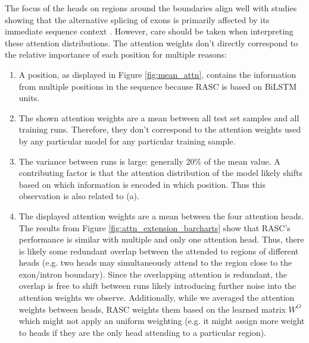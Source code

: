 The focus of the heads on regions around the boundaries align well with studies showing that the alternative splicing of exons is primarily affected by its immediate sequence context \cite{dsc} \cite{immediatesequencemostimportant} \cite{immediatesequencemostimportant2}. 
However, care should be taken when interpreting these attention distributions. The attention weights don't directly correspond to the relative importance of each position for multiple reasons: 
\begin{enumerate}[label=(\alph*)]
	\item A position, as displayed in Figure \ref{fig:mean_attn}, contains the information from multiple positions in the sequence because RASC is based on BiLSTM units.
	\item The shown attention weights are a mean between all test set samples and all training runs. Therefore, they don't correspond to the attention weights used by any particular model for any particular training sample. 
	\item The variance between runs is large: generally 20\% of the mean value. A contributing factor is that the attention distribution of the model likely shifts based on which information is encoded in which position. Thus this observation is also related to (a).
	\item The displayed attention weights are a mean between the four attention heads. The results from Figure \ref{fig:attn_extension_barcharts} show that RASC's performance is similar with multiple and only one attention head. Thus, there is likely some redundant overlap between the attended to regions of different heads (e.g. two heads may simultaneously attend to the region close to the exon/intron boundary). Since the overlapping attention is redundant, the overlap is free to shift between runs likely introducing further noise into the attention weights we observe. Additionally, while we averaged the attention weights between heads, RASC weights them based on the learned matrix $W^O$ which might not apply an uniform weighting (e.g. it might assign more weight to heads if they are the only head attending to a particular region). 
\end{enumerate}

